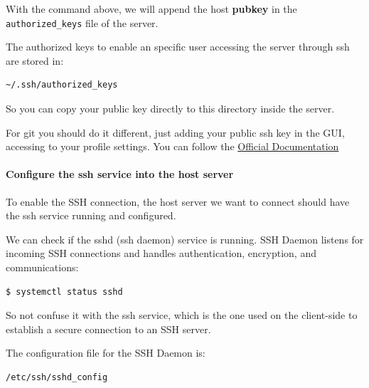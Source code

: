 \documentclass{article}
\newenvironment{blocktemplateII}[1]{%
    \tcolorbox[beamer,%
    noparskip,breakable,
    colframe=Green,%
    colbacklower=LimeGreen!75!LightGreen,%
    title=#1]}%
    {\endtcolorbox}
\newenvironment{blocktemplateIII}[1]{%
    \tcolorbox[beamer,%
    noparskip,breakable,
    ,colframe=Red,%
    colbacklower=LimeGreen!75!LightGreen,%
    title=#1]}%
    {\endtcolorbox}
\newenvironment{codetemplate}[1][]{%
  \mybasecolorbox[#1]
  \itshape
}{%
  \endmybasecolorbox
}
\begin{document}
\begin{blocktemplateIII}{WARNING}
With the command above, we will append the host \textbf{pubkey} in the \verb|authorized_keys| file of the server.
\end{blocktemplateIII}

The authorized keys to enable an specific user accessing the server through ssh are stored in:

\begin{codetemplate}{}
\begin{verbatim}
~/.ssh/authorized_keys
\end{verbatim}
\end{codetemplate}
    
So you can copy your public key directly to this directory inside the server.

\begin{blocktemplateII}{Note}
For git you should do it different, just adding your public ssh key in the GUI, accessing to your profile settings. You can follow the \href{https://docs.github.com/en/authentication/connecting-to-github-with-ssh/adding-a-new-ssh-key-to-your-github-account}{Official Documentation}
\end{blocktemplateII}

\paragraph{Configure the ssh service into the host server}

To enable the SSH connection, the host server we want to connect should have the ssh service running and configured. 

We can check if the sshd (ssh daemon) service is running. SSH Daemon listens for incoming SSH connections and handles authentication, encryption, and communications: 

\begin{codetemplate}{}
\begin{verbatim}
$ systemctl status sshd
\end{verbatim}
\end{codetemplate}

\begin{blocktemplateIII}{WARNING}
So not confuse it with the ssh service,  which is the one used on the client-side to establish a secure connection to an SSH server. 
\end{blocktemplateIII}

The configuration file for the SSH Daemon is:
\begin{codetemplate}{}
\begin{verbatim}
/etc/ssh/sshd_config
\end{verbatim}
\end{codetemplate}
\end{document}

